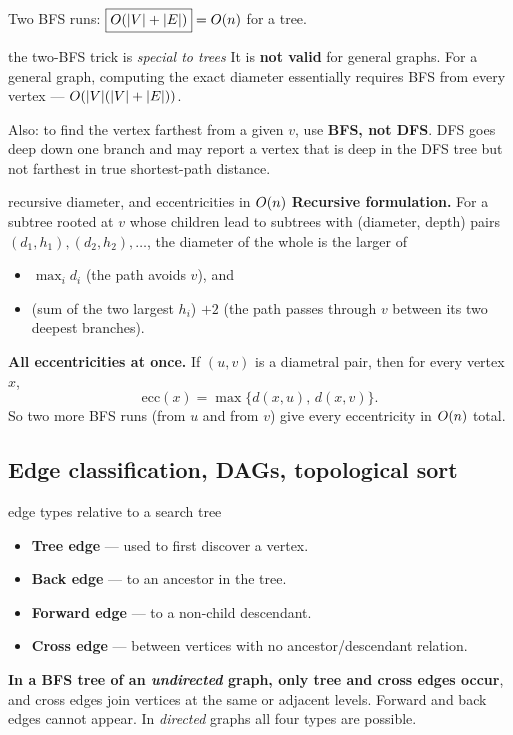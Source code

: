 \begin{cplx}
Two BFS runs: $\boxed{O(|V|+|E|)}=O(n)$ for a tree.
\end{cplx}

\begin{trap}{the two-BFS trick is \emph{special to trees}}
It is \textbf{not valid} for general graphs. For a general graph, computing the exact diameter
essentially requires BFS from every vertex --- $O(|V|(|V|+|E|))$.

Also: to find the vertex farthest from a given $v$, use \textbf{BFS, not DFS}. DFS goes deep down
one branch and may report a vertex that is deep in the DFS tree but not farthest in true
shortest-path distance.
\end{trap}

\begin{facts}{recursive diameter, and eccentricities in $O(n)$}
\textbf{Recursive formulation.} For a subtree rooted at $v$ whose children lead to subtrees with
(diameter, depth) pairs $(d_1,h_1),(d_2,h_2),\dots$, the diameter of the whole is the larger of
\begin{itemize}
  \item $\max_i d_i$ (the path avoids $v$), and
  \item (sum of the two largest $h_i$) $+2$ (the path passes through $v$ between its two deepest
        branches).
\end{itemize}
\textbf{All eccentricities at once.} If $(u,v)$ is a diametral pair, then for every vertex $x$,
\[
  \mathrm{ecc}(x)=\max\{d(x,u),\,d(x,v)\}.
\]
So two more BFS runs (from $u$ and from $v$) give every eccentricity in $O(n)$ total.
\end{facts}

\subsection*{Edge classification, DAGs, topological sort}

\begin{facts}{edge types relative to a search tree}
\begin{itemize}
  \item \textbf{Tree edge} --- used to first discover a vertex.
  \item \textbf{Back edge} --- to an ancestor in the tree.
  \item \textbf{Forward edge} --- to a non-child descendant.
  \item \textbf{Cross edge} --- between vertices with no ancestor/descendant relation.
\end{itemize}
\textbf{In a BFS tree of an \emph{undirected} graph, only tree and cross edges occur}, and cross
edges join vertices at the same or adjacent levels. Forward and back edges cannot appear. In
\emph{directed} graphs all four types are possible.
\end{facts}

